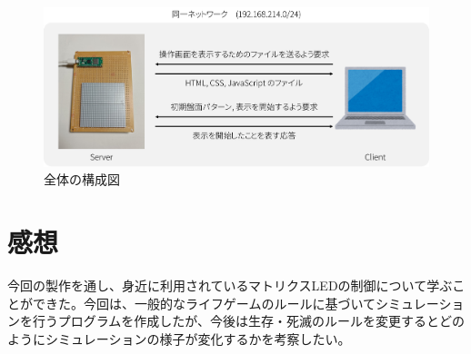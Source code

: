 \documentclass{jlreq}
\begin{document}
\begin{figure}[h]
    \begin{center}
        \includegraphics[width=130mm]{img/structure.png}
    \end{center}
    \caption{全体の構成図}
    \label{img:structure}
\end{figure}

\section{感想}
今回の製作を通し、身近に利用されているマトリクスLEDの制御について学ぶことができた。今回は、一般的なライフゲームのルールに基づいてシミュレーションを行うプログラムを作成したが、今後は生存・死滅のルールを変更するとどのようにシミュレーションの様子が変化するかを考察したい。
\end{document}
